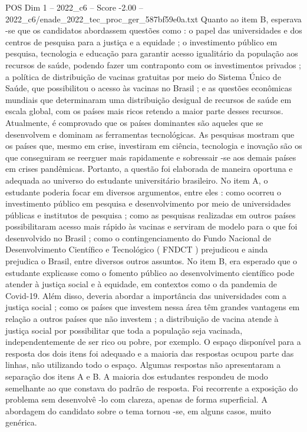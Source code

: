 \begin{textsample}{POS Dim 1 – 2022\_c6 – Score -2.00 – 2022\_c6/enade\_2022\_tec\_proc\_ger\_587bf59e0a.txt}
Quanto ao item B, esperava -se que os candidatos abordassem questões como : o papel das universidades e dos centros de pesquisa para a justiça e a equidade ; o investimento público em pesquisa, tecnologia e educação para garantir acesso igualitário da população aos recursos de saúde, podendo fazer um contraponto com os investimentos privados ; a política de distribuição de vacinas gratuitas por meio do Sistema Único de Saúde, que possibilitou o acesso às vacinas no Brasil ; e as questões econômicas mundiais que determinaram uma distribuição desigual de recursos de saúde em escala global, com os países mais ricos retendo a maior parte desses recursos.
Atualmente, é comprovado que os países dominantes são aqueles que se desenvolvem e dominam as ferramentas tecnológicas.
As pesquisas mostram que os países que, mesmo em crise, investiram em ciência, tecnologia e inovação são os que conseguiram se reerguer mais rapidamente e sobressair -se aos demais países em crises pandêmicas.
Portanto, a questão foi elaborada de maneira oportuna e adequada ao universo do estudante universitário brasileiro.
No item A, o estudante poderia focar em diversos argumentos, entre eles : como ocorreu o investimento público em pesquisa e desenvolvimento por meio de universidades públicas e institutos de pesquisa ; como as pesquisas realizadas em outros países possibilitaram acesso mais rápido às vacinas e serviram de modelo para o que foi desenvolvido no Brasil ; como o contingenciamento do Fundo Nacional de Desenvolvimento Científico e Tecnológico ( FNDCT ) prejudicou e ainda prejudica o Brasil, entre diversos outros assuntos.
No item B, era esperado que o estudante explicasse como o fomento público ao desenvolvimento científico pode atender à justiça social e à equidade, em contextos como o da pandemia de Covid-19.
Além disso, deveria abordar a importância das universidades com a justiça social ; como os países que investem nessa área têm grandes vantagens em relação a outros países que não investem ; a distribuição de vacina atende à justiça social por possibilitar que toda a população seja vacinada, independentemente de ser rico ou pobre, por exemplo.
O espaço disponível para a resposta dos dois itens foi adequado e a maioria das respostas ocupou parte das linhas, não utilizando todo o espaço.
Algumas respostas não apresentaram a separação dos itens A e B.
A maioria dos estudantes respondeu de modo semelhante ao que constava do padrão de resposta.
Foi recorrente a exposição do problema sem desenvolvê -lo com clareza, apenas de forma superficial.
A abordagem do candidato sobre o tema tornou -se, em alguns casos, muito genérica.

\end{textsample}
